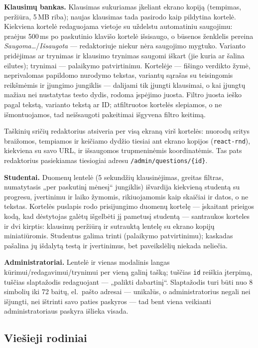 \documentclass[11pt,a4paper]{article}
\newcommand{\code}[1]{\texttt{#1}}
\begin{document}
\textbf{Klausimų bankas.} Klausimas sukuriamas įkeliant ekrano
kopiją (tempimas, peržiūra, 5\,MB riba); naujas klausimas tada
pasirodo kaip pildytina kortelė. Kiekviena kortelė redaguojama
vietoje su uždelstu automatiniu saugojimu: praėjus 500\,ms po
paskutinio klavišo kortelė išsisaugo, o būsenos ženklelis pereina
\emph{Saugoma\ldots}/\emph{Išsaugota} — redaktoriuje niekur nėra
saugojimo mygtuko. Varianto pridėjimas ar trynimas ir klausimo
trynimas saugomi iškart (jie kuria ar šalina eilutes); trynimai —
palaikymo patvirtinimu. Kortelėje — fišingo verdikto žymė,
neprivalomas papildomo nurodymo tekstas, variantų sąrašas su
teisingomis reikšmėmis ir įjungimo jungiklis — dalijami tik įjungti
klausimai, o kai įjungtų mažiau nei nustatytas testo dydis,
rodoma įspėjimo juosta. Filtro juosta ieško pagal tekstą, varianto
tekstą ar ID; atfiltruotos kortelės slepiamos, o ne išmontuojamos,
tad neišsaugoti pakeitimai išgyvena filtro keitimą.

Taškinių sričių redaktorius atsiveria per visą ekraną virš kortelės:
nuorodų sritys braižomos, tempiamos ir keičiamo dydžio tiesiai ant
ekrano kopijos (\code{react-rnd}), kiekviena su savo URL, ir
išsaugomos trupmeninėmis koordinatėmis. Tas pats redaktorius
pasiekiamas tiesiogiai adresu \code{/admin/questions/\{id\}}.

\textbf{Studentai.} Duomenų lentelė (5 sekundžių klausinėjimas,
greitas filtras, numatytasis „per paskutinį mėnesį`` jungiklis)
išvardija kiekvieną studentą su progresu, įvertinimu ir laiko
žymomis, rikiuojamomis kaip skaičiai ir datos, o ne tekstas. Kortelės
puslapis rodo prisijungimo duomenų kortelę —
įskaitant prieigos kodą, kad dėstytojas galėtų išgelbėti jį pametusį
studentą — santraukos korteles ir dvi kirptis: klausimų peržiūrą ir
sutrauktą lentelę su ekrano kopijų miniatiūromis. Studentus galima
trinti (palaikymo patvirtinimu); kaskadas pašalina jų išdalytą testą
ir įvertinimus, bet paveikslėlių niekada neliečia.

\textbf{Administratoriai.} Lentelė ir vienas modalinis langas
kūrimui/redagavimui/trynimui per vieną galinį tašką; tuščias
\code{id} reiškia įterpimą, tuščias slaptažodis redaguojant —
„palikti dabartinį``. Slaptažodis turi būti nuo 8 simbolių iki 72
baitų, el.~pašto adresai — unikalūs, o administratorius negali nei
išjungti, nei ištrinti savo paties paskyros — tad bent viena veikianti
administratoriaus paskyra išlieka visada.

\subsection{Viešieji rodiniai}
\end{document}
